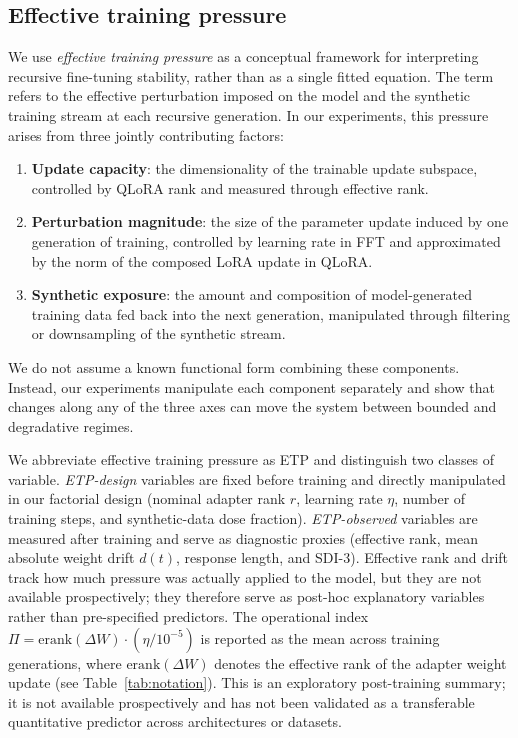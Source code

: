 \documentclass[a4paper,fleqn]{cas-dc}
\newif\ifshowchanges
\newcommand{\rev}[1]{\ifshowchanges{\color{blue}#1}\else{#1}\fi}
\begin{document}
\subsection{Effective training pressure}\label{sec:pressure}

We use \textit{effective training pressure} as a conceptual framework for
interpreting recursive fine-tuning stability, rather than as a single fitted
equation. The term refers to the effective perturbation imposed on the model and
the synthetic training stream at each recursive generation. In our experiments,
this pressure arises from three jointly contributing factors:

\begin{enumerate}
    \item \textbf{Update capacity}: the dimensionality of the trainable update
    subspace, controlled by QLoRA rank and measured through effective rank.

    \item \textbf{Perturbation magnitude}: the size of the parameter update
    induced by one generation of training, controlled by learning rate in FFT and
    approximated by the norm of the composed LoRA update in QLoRA.

    \item \textbf{Synthetic exposure}: the amount and composition of
    model-generated training data fed back into the next generation, manipulated
    through filtering or downsampling of the synthetic stream.
\end{enumerate}

We do not assume a known functional form combining these components. Instead,
our experiments manipulate each component separately and show that changes along
any of the three axes can move the system between bounded and degradative
regimes.

\rev{We abbreviate effective training pressure as ETP and distinguish two classes of variable. \emph{ETP-design} variables are fixed before training and
directly manipulated in our factorial design (nominal adapter rank $r$, learning
rate $\eta$, number of training steps, and synthetic-data dose fraction). \emph{ETP-observed} variables are measured after training and serve as diagnostic
proxies (effective rank, mean absolute weight drift $d(t)$, response length, and
SDI-3). Effective rank and drift track how much pressure was actually applied to
the model, but they are not available prospectively; they therefore serve as
post-hoc explanatory variables rather than pre-specified predictors. The
operational index $\Pi = \mathrm{erank}(\Delta W) \cdot (\eta / 10^{-5})$ is reported as the mean across training generations, where $\mathrm{erank}(\Delta W)$ denotes the effective rank of the adapter weight update (see Table~\ref{tab:notation}). This is
an exploratory post-training summary; it is not available prospectively and has not been validated as a transferable quantitative predictor across architectures or datasets.}
\end{document}
